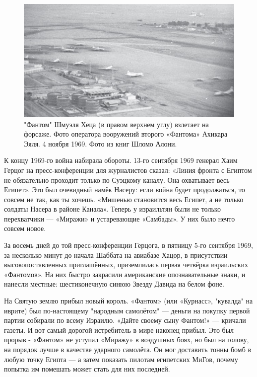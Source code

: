 \begin{figure}[h!tb] 
	\centering\includegraphics[scale=0.4]{Dolina_2/Aub6T35ajmo.jpg}
	\caption{"Фантом" Шмуэля Хеца (в правом верхнем углу) взлетает на форсаже. Фото оператора вооружений второго «Фантома» Ахикара Эяля. 4 ноября 1969. Фото из книг Шломо Алони.}%
\end{figure}

К концу 1969-го война набирала обороты. 13-го сентября 1969 генерал Хаим Герцог на пресс-конференции для журналистов сказал: «Линия фронта с Египтом не обязательно проходит только по Суэцкому каналу. Она охватывает весь Египет». Это был очевидный намёк Насеру: если война будет продолжаться, то совсем не так, как ты хочешь. «Мишенью становится весь Египет, а не только солдаты Насера в районе Канала». Теперь у израильтян были не только перехватчики — «Миражи» и устаревающие «Самбады». У них было нечто совсем новое.

За восемь дней до той пресс-конференции Герцога, в пятницу 5-го сентября 1969, за несколько минут до начала Шаббата на авиабазе Хацор, в присутствии высокопоставленных приглашённых, приземлилась первая четвёрка израильских «Фантомов». На них быстро закрасили американские опознавательные знаки, и нанесли местные: шестиконечную синюю Звезду Давида на белом фоне.

На Святую землю прибыл новый король. «Фантом» (или «Курнасс», "кувалда" на иврите) был по-настоящему "народным самолётом" — деньги на покупку первой партии собирали по всему Израилю. «Дайте своему сыну Фантом!» — кричали газеты. И вот самый дорогой истребитель в мире наконец прибыл. Это был прорыв - «Фантом» не уступал «Миражу» в воздушных боях, но был на голову, на порядок лучше в качестве ударного самолёта. Он мог доставить тонны бомб в любую точку Египта — а затем показать пилотам египетских МиГов, почему попытка им помешать может стать для них последней.

